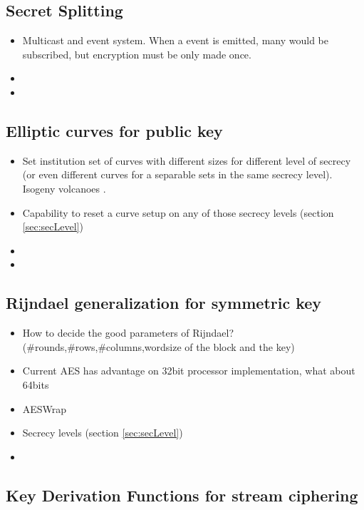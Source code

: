\documentclass[10pt,a4paper,twoside]{llncs}
\begin{document}
\subsection{Secret Splitting \label{sec:secretSplitting}}
\begin{itemize}
 \item Multicast and event system. When a event is emitted, many would be subscribed, but encryption must be only made once.
 \item
 \item
\end{itemize}

%
\subsection{Elliptic curves for public key \label{sec:ecpk}}

\begin{itemize}
 \item Set institution set of curves with different sizes for different level of secrecy (or even different curves for a separable sets in the same secrecy level). Isogeny volcanoes \cite{secRickShareECs}.
 \item Capability to reset a curve setup on any of those secrecy levels (section \ref{sec:secLevel})
 \item 
 \item 
\end{itemize}

%
\subsection{Rijndael generalization for symmetric key \label{sec:gRijndael}}

\begin{itemize}
 \item How to decide the good parameters of Rijndael? (\#rounds,\#rows,\#columns,wordsize of the block and the key) \cite{gRijndael}
 \item Current AES has advantage on 32bit processor implementation, what about 64bits
 \item AESWrap \cite{rfc3394}
 \item Secrecy levels (section \ref{sec:secLevel})
 \item 
\end{itemize}

%
\subsection{Key Derivation Functions for stream ciphering \label{sec:kdfStreaming}}
\end{document}
